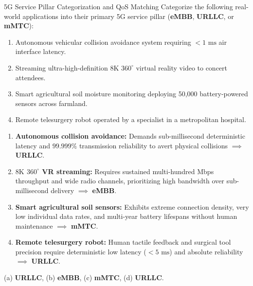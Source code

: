 \begin{solved}{5G Service Pillar Categorization and QoS Matching}
\Given Categorize the following real-world applications into their primary 5G service pillar (\textbf{eMBB}, \textbf{URLLC}, or \textbf{mMTC}):
\begin{enumerate}[label=(\alph*),leftmargin=*]
  \item Autonomous vehicular collision avoidance system requiring $< 1\text{ ms}$ air interface latency.
  \item Streaming ultra-high-definition $8\text{K}$ $360^\circ$ virtual reality video to concert attendees.
  \item Smart agricultural soil moisture monitoring deploying 50,000 battery-powered sensors across farmland.
  \item Remote telesurgery robot operated by a specialist in a metropolitan hospital.
\end{enumerate}
\Steps
\begin{enumerate}[leftmargin=*]
  \item \textbf{Autonomous collision avoidance:} Demands sub-millisecond deterministic latency and $99.999\%$ transmission reliability to avert physical collisions $\implies$ \textbf{URLLC}.
  \item \textbf{$8\text{K}$ $360^\circ$ VR streaming:} Requires sustained multi-hundred Mbps throughput and wide radio channels, prioritizing high bandwidth over sub-millisecond delivery $\implies$ \textbf{eMBB}.
  \item \textbf{Smart agricultural soil sensors:} Exhibits extreme connection density, very low individual data rates, and multi-year battery lifespans without human maintenance $\implies$ \textbf{mMTC}.
  \item \textbf{Remote telesurgery robot:} Human tactile feedback and surgical tool precision require deterministic low latency ($< 5\text{ ms}$) and absolute reliability $\implies$ \textbf{URLLC}.
\end{enumerate}
\Answer (a) \textbf{URLLC}, (b) \textbf{eMBB}, (c) \textbf{mMTC}, (d) \textbf{URLLC}.
\end{solved}

